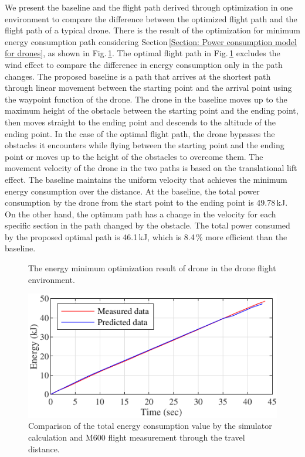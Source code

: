 \documentclass[journal]{./template/IEEEtran}
\begin{document}
We present the baseline and the flight path derived through optimization in one environment to compare the difference between the optimized flight path and the flight path of a typical drone.
There is the result of the optimization for minimum energy consumption path considering Section\,\ref{Section: Power consumption model for drones}, as shown in Fig.\,\ref{fig: opt_environ}.
The optimal flight path in Fig.\,\ref{fig: opt_environ} excludes the wind effect to compare the difference in energy consumption only in the path changes.
The proposed baseline is a path that arrives at the shortest path through linear movement between the starting point and the arrival point using the waypoint function of the drone. The drone in the baseline moves up to the maximum height of the obstacle between the starting point and the ending point, then moves straight to the ending point and descends to the altitude of the ending point. 
In the case of the optimal flight path, the drone bypasses the obstacles it encounters while flying between the starting point and the ending point or moves up to the height of the obstacles to overcome them. 
The movement velocity of the drone in the two paths is based on the translational lift effect.
The baseline maintains the uniform velocity that achieves the minimum energy consumption over the distance. 
At the baseline, the total power consumption by the drone from the start point to the ending point is 49.78\,kJ.
On the other hand, the optimum path has a change in the velocity for each specific section in the path changed by the obstacle. 
The total power consumed by the proposed optimal path is 46.1\,kJ, which is 8.4\,\% more efficient than the baseline. 


\begin{figure}[ht]
\centering
{}
\qquad
{}
\caption{The energy minimum optimization result of drone in the drone flight environment.}
\label{fig: opt_environ}
\end{figure}

\begin{figure}[ht]
\centering\includegraphics[scale=1.0]{fig14/S_E.pdf}
\caption{Comparison of the total energy consumption value by the simulator calculation and M600 flight measurement through the travel distance.}
\label{fig:consumed_energy}
\end{figure}
\end{document}
